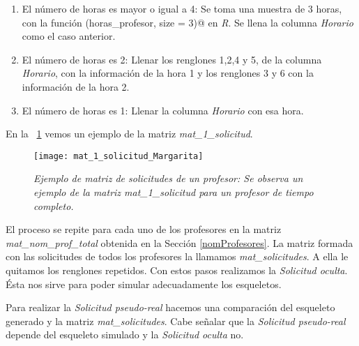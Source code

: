 \begin{enumerate}
\begin{enumerate}
\item El número de horas es mayor o igual a 4: Se toma una muestra de 3 horas, con la función \verb@sample(horas_profesor, size = 3)@ en \textit{R}. Se llena la columna \textit{Horario} como el caso anterior.

\item El número de horas es 2: Llenar los renglones 1,2,4 y 5, de la columna \textit{Horario}, con la información de la hora 1 y los renglones 3 y 6 con la información de la hora 2.

\item El número de horas es 1: Llenar la columna \textit{Horario} con esa hora.
\end{enumerate}
\end{enumerate}

En la \figurename{~\ref{mat_1_solicitud_Margarita}} vemos un ejemplo de la matriz \textit{mat\_1\_solicitud}.

\begin{figure}[H]
\centering
\texttt{[image: mat\_1\_solicitud\_Margarita]} %
\caption[\textit{Ejemplo de matriz de solicitudes de un profesor}]{\textit{Ejemplo de matriz de solicitudes de un profesor: Se observa un ejemplo de la matriz mat\_1\_solicitud para un profesor de tiempo completo.}}\label{mat_1_solicitud_Margarita}
\end{figure}

El proceso se repite para cada uno de los profesores en la matriz \textit{mat\_nom\_prof\_total} obtenida en la Sección \ref{nomProfesores}. La matriz formada con las solicitudes de todos los profesores la llamamos \textit{mat\_solicitudes}. A ella le quitamos los renglones repetidos. Con estos pasos realizamos la \textit{Solicitud oculta}. Ésta nos sirve para poder simular adecuadamente los esqueletos.

Para realizar la \textit{Solicitud pseudo-real} hacemos una comparación del esqueleto generado y la matriz \textit{mat\_solicitudes}. Cabe señalar que la \textit{Solicitud pseudo-real} depende del esqueleto simulado y la \textit{Solicitud oculta} no.
